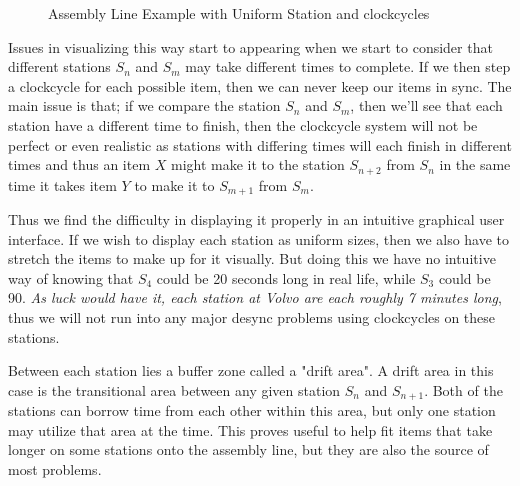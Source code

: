 \documentclass[12pt,a4paper]{report}
\begin{document}
\begin{figure}[ht]
    \caption{Assembly Line Example with Uniform Station and clockcycles}
    \label{fig:assembly}
\end{figure}

    Issues in visualizing this way start to appearing when we start to consider that different stations $S_n$ and $S_m$ may take different times to complete. If we then step a clockcycle for each possible item, then we can never keep our items in sync. The main issue is that; if we compare the station $S_n$ and $S_m$, then we'll see that each station have a different time to finish, then the clockcycle system will not be perfect or even realistic as stations with differing times will each finish in different times and thus an item $X$ might make it to the station $S_{n+2}$ from $S_n$ in the same time it takes item $Y$ to make it to $S_{m+1}$ from $S_{m}$.

Thus we find the difficulty in displaying it properly in an intuitive graphical user interface. If we wish to display each station as uniform sizes, then we also have to stretch the items to make up for it visually. But doing this we have no intuitive way of knowing that $S_4$ could be 20 seconds long in real life, while $S_3$ could be 90. \textit{As luck would have it, each station at Volvo are each roughly 7 minutes long}, thus we will not run into any major desync problems using clockcycles on these stations.

Between each station lies a buffer zone called a "drift area". A drift area in this case is the transitional area between any given station $S_n$ and $S_{n+1}$. Both of the stations can borrow time from each other within this area, but only one station may utilize that area at the time. This proves useful to help fit items that take longer on some stations onto the assembly line, but they are also the source of most problems.
\end{document}
